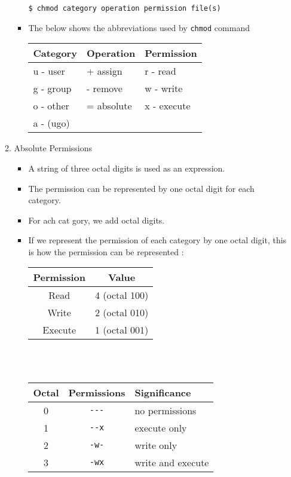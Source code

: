 \documentclass{article}
\begin{document}
\begin{enumerate}
\begin{enumerate}[label=\roman*)]
\begin{itemize}
							\verb|$ chmod category operation permission file(s)|
						\item The below shows the abbreviations used by \verb|chmod| command
							\begin{table}[H]
								\centering
								\begin{tabular}{l|l|l}
									Category & Operation & Permission \\ \hline
									u - user & + assign & r - read \\
									g - group & - remove & w - write \\
									o - other & = absolute & x - execute \\
									a - (ugo) & &
								\end{tabular}
							\end{table}
					\end{itemize}
				\item Absolute Permissions
					\begin{itemize}
						\item A string of three octal digits is used as an expression.
						\item The permission can be represented by one octal digit for each category.
						\item For ach cat gory, we add octal digits.
						\item If we represent the permission of each category by one octal digit, this is how
							the permission can be represented :
							\begin{table}[H]
								\centering
								\begin{tabular}{c|c}
									Permission & Value \\ \hline
									Read & 4 (octal 100) \\
									Write & 2 (octal 010) \\
									Execute & 1 (octal 001)
								\end{tabular} \\ ~\vspace{1em} \\
								\begin{tabular}{c|c|l}
									Octal & Permissions & Significance \\ \hline
									0 & \verb|---| & no permissions \\
									1 & \verb|--x| & execute only \\
									2 & \verb|-w-| & write only \\
									3 & \verb|-wx| & write and execute \\

\end{tabular}
\end{table}
\end{itemize}
\end{enumerate}
\end{enumerate}
\end{document}
